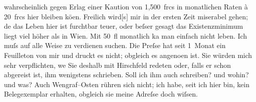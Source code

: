                wahrscheinlich gegen Erlag einer Kaution von 1,500 frcs in monatlichen Raten à
               20 frcs hier bleiben kö{\geminationn}en. Freilich
                  wird{[}s{]} mir in {\pb}der ersten Zeit
               miserabel gehen; de{\geminationn} das Leben hier ist furchtbar teuer,
               oder beſser gesagt das Existenzminimum liegt viel höher als in Wien. Mit 50 fl monatlich ka{\geminationn} man
               einfach nicht leben. Ich muſs auf alle Weise zu verdienen suchen. Die Preſse hat seit 1 Monat ein Feuilleton von mir und druckt es nicht;
               obgleich es angeno{\geminationm}en ist. Sie würden mich sehr
               verpflichten, we{\geminationn} Sie deshalb mit Hirschfeld redeten oder, falls er schon abgereist ist, ihm
               wenigstens schrieben. Soll ich ihm auch schreiben? und wohin? und was? Auch Wengraf–Osten rühren sich nicht; ich habe, seit ich hier bin, kein Belegexemplar erhalten, obgleich sie meine Adreſse doch wiſsen.\pend
           

